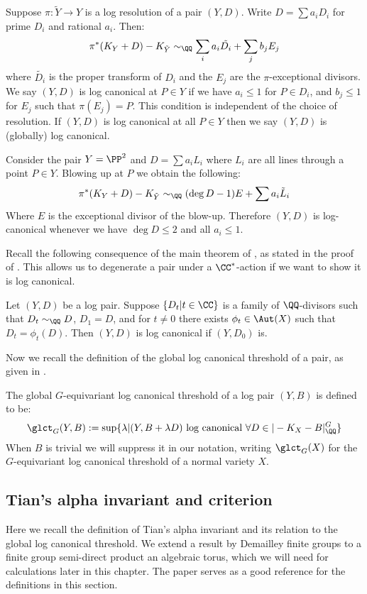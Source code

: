 \begin{definition}
Suppose \(\pi: \tilde{Y} \to Y\) is a log resolution of a pair \((Y,D)\). Write \(D = \sum a_i D_i\) for prime \(D_i\) and rational \(a_i\). Then:
\[
\pi^*(K_Y+ D) - K_{\tilde{Y}}\sim_{\QQ} \sum_i a_i \tilde{D_i} + \sum_j b_j E_j
\]
where \(\tilde{D_i}\) is the proper transform of \(D_i\) and the \(E_j\) are the \(\pi\)-exceptional divisors. We say \((Y,D)\) is log canonical at \(P \in Y\) if we have \(a_i \le 1 \) for \(P \in D_i\), and \(b_j \le 1\) for \(E_j\) such that \(\pi(E_j) = P\). This condition is independent of the choice of resolution. If \((Y,D)\) is log canonical at all \(P  \in Y\) then we say \((Y,D)\) is (globally) log canonical.
\end{definition}
\begin{example} \label{examplelct}
Consider the pair \(Y = \PP^2\) and \(D = \sum a_i L_i\) where \(L_i\) are all lines through a point \(P \in Y\). Blowing up at \(P\) we obtain the following:
\[
\pi^*(K_Y+D) - K_{\tilde{Y}} \sim_{\QQ} (\deg D - 1) E + \sum a_i \tilde{L}_i
\]
Where \(E\) is the exceptional divisor  of the blow-up. Therefore \((Y,D)\) is log-canonical whenever we have \(\deg D \le 2\) and all \(a_i \le 1\).
\end{example}
Recall the following consequence of the main theorem of \cite{demailly2001}, as stated in the proof of \cite[Lemma 5.1]{cheltsov08}. This allows us to degenerate a pair under a \(\CC^*\)-action if we want to show it is log canonical.
\begin{proposition} \label{degenpair}
Let \((Y,D)\) be a log pair. Suppose \(\{ D_t | t \in \CC\}\) is a family of \(\QQ\)-divisors such that \(D_t \sim_\QQ D\), \(D_1 = D\), and for \(t \neq 0\) there exists \(\phi_t \in \Aut(X)\) such that \(D_t = \phi_t(D)\). Then \((Y,D)\) is log canonical if \((Y,D_0)\) is.
\end{proposition}
Now we recall the definition of the global log canonical threshold of a pair, as given in \cite{suess18-2}.
\begin{definition}
The global \(G\)-equivariant log canonical threshold of a log pair \((Y,B)\)  is defined to be:
\[
\glct_{G}(Y,B) := \sup \{ \lambda | (Y,B+ \lambda D) \text{ log canonical } \forall D \in | -K_X - B |_{\QQ}^G \}
\]
When \(B\) is trivial we will suppress it in our notation, writing \(\glct_G(X)\) for the \(G\)-equivariant log canonical threshold of a normal variety \(X\).
\end{definition}
\subsection{Tian's alpha invariant and criterion} \label{prelim:alphainvariant}
Here we recall the definition of Tian's alpha invariant and its relation to the global log canonical threshold. We extend a result by Demailley finite groups to a finite group semi-direct product an algebraic torus, which we will need for calculations later in this chapter. The paper \cite{cheltsov08} serves as a good reference for the definitions in this section.

